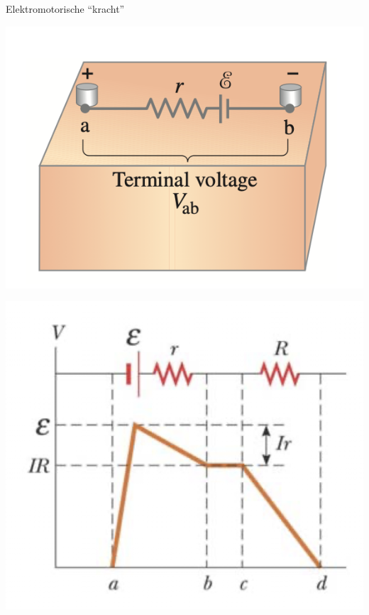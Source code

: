 \begin{theo}{Elektromotorische “kracht”}
\begin{center}
        \begin{minipage}{.3 \textwidth}
            \includegraphics[scale = 0.45]{Images/Elektriciteit/Source.png}
        \end{minipage}
        \begin{minipage}{.3 \textwidth}
            \includegraphics[scale = 0.35]{Images/Elektriciteit/EMFgrafiek.png}
        \end{minipage}

    \end{center}

    \vspace{-0.5cm}
\end{theo}

